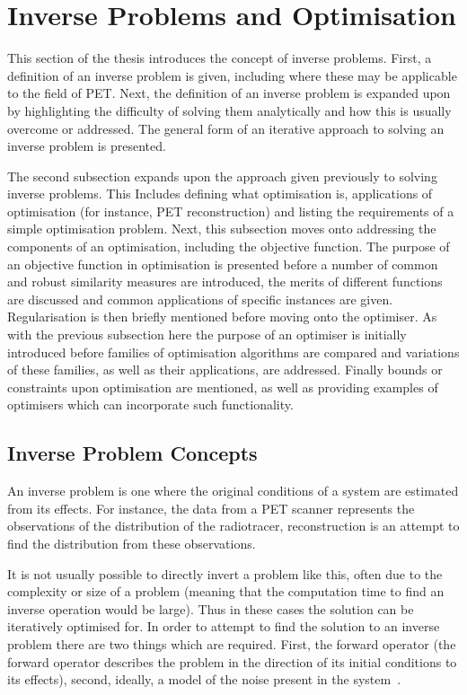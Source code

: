     \section{Inverse Problems and Optimisation} \label{sec:inverse_problems_and_optimisation}
        This section of the thesis introduces the concept of inverse problems. First, a definition of an inverse problem is given, including where these may be applicable to the field of \gls{PET}. Next, the definition of an inverse problem is expanded upon by highlighting the difficulty of solving them analytically and how this is usually overcome or addressed. The general form of an iterative approach to solving an inverse problem is presented.
            
        The second subsection expands upon the approach given previously to solving inverse problems. This Includes defining what optimisation is, applications of optimisation (for instance, \gls{PET} reconstruction) and listing the requirements of a simple optimisation problem. Next, this subsection moves onto addressing the components of an optimisation, including the objective function. The purpose of an objective function in optimisation is presented before a number of common and robust similarity measures are introduced, the merits of different functions are discussed and common applications of specific instances are given. Regularisation is then briefly mentioned before moving onto the optimiser. As with the previous subsection here the purpose of an optimiser is initially introduced before families of optimisation algorithms are compared and variations of these families, as well as their applications, are addressed. Finally bounds or constraints upon optimisation are mentioned, as well as providing examples of optimisers which can incorporate such functionality.
        
        \subsection{Inverse Problem Concepts} \label{sec:inverse_problem_concepts}
            An inverse problem is one where the original conditions of a system are estimated from its effects. For instance, the data from a \gls{PET} scanner represents the observations of the distribution of the radiotracer, reconstruction is an attempt to find the distribution from these observations.
            
            It is not usually possible to directly invert a problem like this, often due to the complexity or size of a problem (meaning that the computation time to find an inverse operation would be large). Thus in these cases the solution can be iteratively optimised for. In order to attempt to find the solution to an inverse problem there are two things which are required. First, the forward operator (the forward operator describes the problem in the direction of its initial conditions to its effects), %
            second, ideally, a model of the noise present in the system~\parencite{Brusaferri2020ImprovingInformation, Emond2020ImprovingEffectiveness}. %
        
